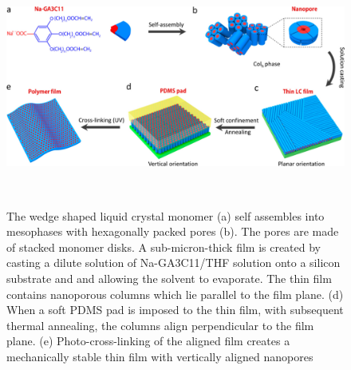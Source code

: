 \documentclass{article}
\begin{document}
  \begin{figure}
	\centering
	\includegraphics[width=\linewidth]{soft_confinement.png}
	\caption{The wedge shaped liquid crystal monomer (a) self assembles into 
	mesophases with hexagonally packed pores (b). The pores are made of 
	stacked monomer disks. A sub-micron-thick film is created by casting a 
	dilute solution of Na-GA3C11/THF solution onto a silicon substrate and 
	and allowing the solvent to evaporate. The thin film contains nanoporous 
	columns which lie parallel to the film plane. (d) When a soft PDMS pad is 
	imposed to the thin film, with subsequent thermal annealing, the columns
	align perpendicular to the film plane. (e) Photo-cross-linking of the
	aligned film creates a mechanically stable thin film with vertically 
	aligned nanopores}~\label{fig:soft}
  \end{figure}
\end{document}
